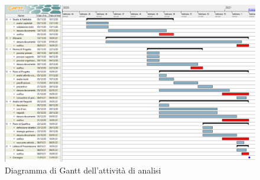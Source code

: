 \begin{landscape}

\begin{figure}[h]
	\centering
	\includegraphics[width=\linewidth]{Images/GanttPianificazioneAnalisi.PNG}
	\caption{Diagramma di Gantt dell'attività di analisi}
\end{figure}

\end{landscape}




